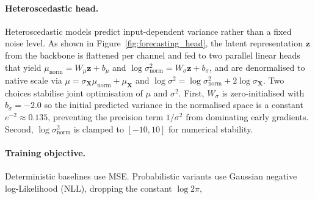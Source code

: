 \documentclass{llncs}
\begin{document}

\paragraph{Heteroscedastic head.}
Heteroscedastic models predict input-dependent variance rather than a fixed noise level. As shown in Figure~\ref{fig:forecasting_head}, the latent representation $\mathbf{z}$ from the backbone is flattened per channel and fed to two parallel linear heads that yield $\mu_\text{norm}=W_{\mu}\mathbf{z}+b_{\mu}$ and $\log\sigma^{2}_\text{norm}=W_{\sigma}\mathbf{z}+b_{\sigma}$, and are denormalised to native scale via $\mu = \sigma_{\mathbf{X}}\mu_\text{norm}+\mu_{\mathbf{X}}$ and $\log\sigma^{2}=\log\sigma^{2}_\text{norm}+2\log\sigma_{\mathbf{X}}$. Two choices stabilise joint optimisation of $\mu$ and $\sigma^{2}$. First, $W_{\sigma}$ is zero-initialised with $b_{\sigma}=-2.0$ so the initial predicted variance in the normalised space is a constant $e^{-2}\!\approx\!0.135$, preventing the precision term $1/\sigma^{2}$ from dominating early gradients. Second, $\log\sigma^{2}_\text{norm}$ is clamped to $[-10,10]$ for numerical stability.

\paragraph{Training objective.}
Deterministic baselines use MSE. Probabilistic variants use Gaussian negative log-Likelihood (NLL), dropping the constant $\log 2\pi$,
\end{document}
